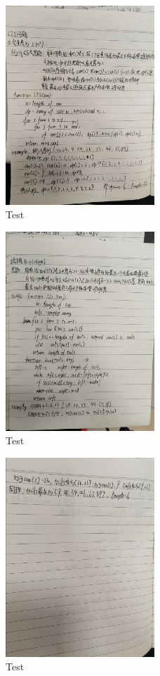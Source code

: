 \documentclass[UTF8]{ctexart}
\begin{document}
\pagestyle{fancy}
\fancyhead{}



\begin{figure}[h]
    \centering
    \includegraphics[width=0.5\textwidth]{./test1.png}
    \caption{Test}
    \label{fig:photo}
\end{figure}

\begin{figure}[h]
    \centering
    \includegraphics[width=0.5\textwidth]{./test2.png}
    \caption{Test}
    \label{fig:photo}
\end{figure}

\begin{figure}[h]
    \centering
    \includegraphics[width=0.5\textwidth]{./test3.png}
    \caption{Test}
    \label{fig:photo}
\end{figure}
\end{document}
